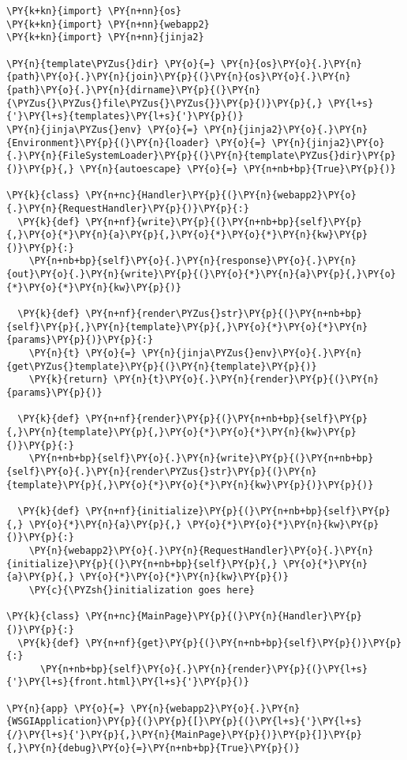 \begin{Verbatim}[commandchars=\\\{\}]
\PY{k+kn}{import} \PY{n+nn}{os}
\PY{k+kn}{import} \PY{n+nn}{webapp2}
\PY{k+kn}{import} \PY{n+nn}{jinja2}

\PY{n}{template\PYZus{}dir} \PY{o}{=} \PY{n}{os}\PY{o}{.}\PY{n}{path}\PY{o}{.}\PY{n}{join}\PY{p}{(}\PY{n}{os}\PY{o}{.}\PY{n}{path}\PY{o}{.}\PY{n}{dirname}\PY{p}{(}\PY{n}{\PYZus{}\PYZus{}file\PYZus{}\PYZus{}}\PY{p}{)}\PY{p}{,} \PY{l+s}{'}\PY{l+s}{templates}\PY{l+s}{'}\PY{p}{)}
\PY{n}{jinja\PYZus{}env} \PY{o}{=} \PY{n}{jinja2}\PY{o}{.}\PY{n}{Environment}\PY{p}{(}\PY{n}{loader} \PY{o}{=} \PY{n}{jinja2}\PY{o}{.}\PY{n}{FileSystemLoader}\PY{p}{(}\PY{n}{template\PYZus{}dir}\PY{p}{)}\PY{p}{,} \PY{n}{autoescape} \PY{o}{=} \PY{n+nb+bp}{True}\PY{p}{)}

\PY{k}{class} \PY{n+nc}{Handler}\PY{p}{(}\PY{n}{webapp2}\PY{o}{.}\PY{n}{RequestHandler}\PY{p}{)}\PY{p}{:}
  \PY{k}{def} \PY{n+nf}{write}\PY{p}{(}\PY{n+nb+bp}{self}\PY{p}{,}\PY{o}{*}\PY{n}{a}\PY{p}{,}\PY{o}{*}\PY{o}{*}\PY{n}{kw}\PY{p}{)}\PY{p}{:}
    \PY{n+nb+bp}{self}\PY{o}{.}\PY{n}{response}\PY{o}{.}\PY{n}{out}\PY{o}{.}\PY{n}{write}\PY{p}{(}\PY{o}{*}\PY{n}{a}\PY{p}{,}\PY{o}{*}\PY{o}{*}\PY{n}{kw}\PY{p}{)}

  \PY{k}{def} \PY{n+nf}{render\PYZus{}str}\PY{p}{(}\PY{n+nb+bp}{self}\PY{p}{,}\PY{n}{template}\PY{p}{,}\PY{o}{*}\PY{o}{*}\PY{n}{params}\PY{p}{)}\PY{p}{:}
    \PY{n}{t} \PY{o}{=} \PY{n}{jinja\PYZus{}env}\PY{o}{.}\PY{n}{get\PYZus{}template}\PY{p}{(}\PY{n}{template}\PY{p}{)}
    \PY{k}{return} \PY{n}{t}\PY{o}{.}\PY{n}{render}\PY{p}{(}\PY{n}{params}\PY{p}{)}

  \PY{k}{def} \PY{n+nf}{render}\PY{p}{(}\PY{n+nb+bp}{self}\PY{p}{,}\PY{n}{template}\PY{p}{,}\PY{o}{*}\PY{o}{*}\PY{n}{kw}\PY{p}{)}\PY{p}{:}
    \PY{n+nb+bp}{self}\PY{o}{.}\PY{n}{write}\PY{p}{(}\PY{n+nb+bp}{self}\PY{o}{.}\PY{n}{render\PYZus{}str}\PY{p}{(}\PY{n}{template}\PY{p}{,}\PY{o}{*}\PY{o}{*}\PY{n}{kw}\PY{p}{)}\PY{p}{)}

  \PY{k}{def} \PY{n+nf}{initialize}\PY{p}{(}\PY{n+nb+bp}{self}\PY{p}{,} \PY{o}{*}\PY{n}{a}\PY{p}{,} \PY{o}{*}\PY{o}{*}\PY{n}{kw}\PY{p}{)}\PY{p}{:}
    \PY{n}{webapp2}\PY{o}{.}\PY{n}{RequestHandler}\PY{o}{.}\PY{n}{initialize}\PY{p}{(}\PY{n+nb+bp}{self}\PY{p}{,} \PY{o}{*}\PY{n}{a}\PY{p}{,} \PY{o}{*}\PY{o}{*}\PY{n}{kw}\PY{p}{)}
    \PY{c}{\PYZsh{}initialization goes here}

\PY{k}{class} \PY{n+nc}{MainPage}\PY{p}{(}\PY{n}{Handler}\PY{p}{)}\PY{p}{:}
  \PY{k}{def} \PY{n+nf}{get}\PY{p}{(}\PY{n+nb+bp}{self}\PY{p}{)}\PY{p}{:}
      \PY{n+nb+bp}{self}\PY{o}{.}\PY{n}{render}\PY{p}{(}\PY{l+s}{'}\PY{l+s}{front.html}\PY{l+s}{'}\PY{p}{)}

\PY{n}{app} \PY{o}{=} \PY{n}{webapp2}\PY{o}{.}\PY{n}{WSGIApplication}\PY{p}{(}\PY{p}{[}\PY{p}{(}\PY{l+s}{'}\PY{l+s}{/}\PY{l+s}{'}\PY{p}{,}\PY{n}{MainPage}\PY{p}{)}\PY{p}{]}\PY{p}{,}\PY{n}{debug}\PY{o}{=}\PY{n+nb+bp}{True}\PY{p}{)}
\end{Verbatim}
